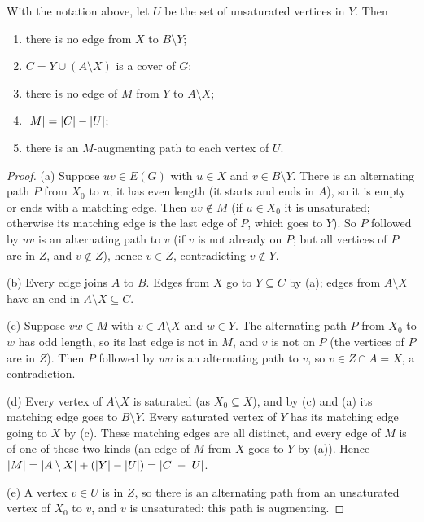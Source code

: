 \begin{lemma}
With the notation above, let $U$ be the set of unsaturated vertices in $Y$. Then
\begin{enumerate}
  \item[(a)] there is no edge from $X$ to $B\setminus Y$;
  \item[(b)] $C = Y\cup(A\setminus X)$ is a cover of $G$;
  \item[(c)] there is no edge of $M$ from $Y$ to $A \setminus X$;
  \item[(d)] $\left\lvert M \right\rvert = \left\lvert C \right\rvert - \left\lvert U \right\rvert$;
  \item[(e)] there is an $M$-augmenting path to each vertex of $U$.
\end{enumerate}
\end{lemma}
\begin{proof}
(a) Suppose $uv \in E(G)$ with $u\in X$ and $v \in B\setminus Y$. There is an alternating path $P$
from $X_0$ to $u$; it has even length (it starts and ends in $A$), so it is empty or ends with a
matching edge. Then $uv \notin M$ (if $u \in X_0$ it is unsaturated; otherwise its matching edge is
the last edge of $P$, which goes to $Y$). So $P$ followed by $uv$ is an alternating path to $v$
(if $v$ is not already on $P$; but all vertices of $P$ are in $Z$, and $v \notin Z$), hence $v \in Z$,
contradicting $v \notin Y$.

(b) Every edge joins $A$ to $B$. Edges from $X$ go to $Y \subseteq C$ by (a); edges from
$A\setminus X$ have an end in $A \setminus X \subseteq C$.

(c) Suppose $vw\in M$ with $v \in A\setminus X$ and $w \in Y$. The alternating path $P$ from $X_0$
to $w$ has odd length, so its last edge is not in $M$, and $v$ is not on $P$ (the vertices of $P$
are in $Z$). Then $P$ followed by $wv$ is an alternating path to $v$, so $v \in Z \cap A = X$, a
contradiction.

(d) Every vertex of $A\setminus X$ is saturated (as $X_0 \subseteq X$), and by (c) and (a) its
matching edge goes to $B\setminus Y$. Every saturated vertex of $Y$ has its matching edge going to
$X$ by (c). These matching edges are all distinct, and every edge of $M$ is of one of these two
kinds (an edge of $M$ from $X$ goes to $Y$ by (a)). Hence
$\left\lvert M \right\rvert = \left\lvert A\setminus X \right\rvert + (\left\lvert Y \right\rvert - \left\lvert U \right\rvert) = \left\lvert C \right\rvert - \left\lvert U \right\rvert$.

(e) A vertex $v \in U$ is in $Z$, so there is an alternating path from an unsaturated vertex of
$X_0$ to $v$, and $v$ is unsaturated: this path is augmenting.
\end{proof}

